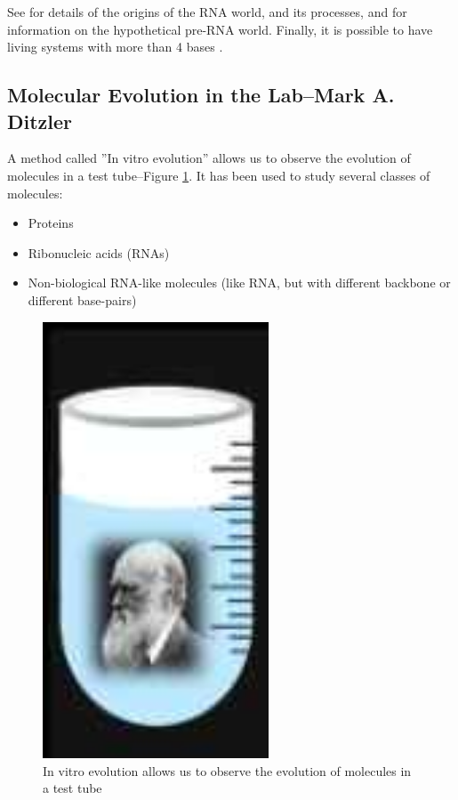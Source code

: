 \documentclass[]{article}
\begin{document}
See \cite{robertson2012origins,joyce2018protocells} for details of the origins of the RNA world, and its processes, and \cite{hud2018searching} for information on the hypothetical pre-RNA world. Finally, it is possible to have living systems with more than 4 bases  \cite{hoshika2019hachimoji}.

\subsection[Molecular Evolution in the Lab]{Molecular Evolution in the Lab--Mark A. Ditzler}

A method called ''In vitro evolution'' allows us to observe the evolution of molecules in a test tube--Figure \ref{fig:InVitroEvolution_Darwin}. It has been used to study several classes of molecules:
\begin{itemize}
	\item Proteins
	\item Ribonucleic acids (RNAs)
	\item Non-biological RNA-like molecules (like RNA, but with different backbone or different base-pairs)
\end{itemize}

\begin{figure}[H]
	\begin{center}
		\caption[In vitro evolution]{In vitro evolution allows us to observe the evolution of molecules in a test tube}\label{fig:InVitroEvolution_Darwin}
		\includegraphics[width=0.6\textwidth]{InVitroEvolution_Darwin}
	\end{center}
\end{figure}
\end{document}
